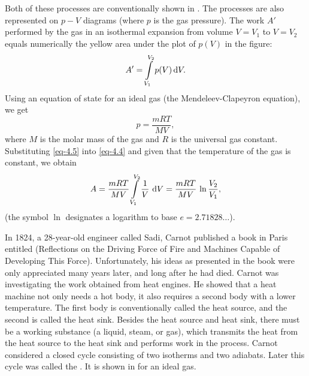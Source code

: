 Both of these processes are conventionally shown in . The processes are also represented on $p-V$ diagrams (where $p$ is the gas pressure). The work $A'$ performed by the gas in an isothermal expansion from volume $V= V_{1}$ to $V= V_{2}$ equals numerically the yellow area under the plot of $p (V)$ in the figure:
\begin{equation}%
A' = \int\displaylimits_{V_{1}}^{V_{2}} p(V) \, \dd V.
\label{eq-4.4}
\end{equation}
Using an equation of state for an ideal gas (the Mendeleev-Clapeyron equation), we get
\begin{equation}%
p= \frac{mRT}{MV},
\label{eq-4.5}
\end{equation}
where $M$ is the molar mass of the gas and $R$ is the universal gas constant. Substituting \eqref{eq-4.5} into \eqref{eq-4.4} and given that the temperature of the gas is constant, we obtain
\begin{equation}%
A = \frac{mRT}{MV} \int\displaylimits_{V_{1}}^{V_{2}} \frac{1}{V} \,\, \dd V = \frac{mRT}{MV} \, \ln \frac{V_{2}}{V_{1}},
\label{eq-4.6}
\end{equation}
(the symbol $\ln$ designates a logarithm to base $e = 2.71828 \ldots{}$). 



 In 1824, a 28-year-old engineer called Sadi, Carnot published a book in Paris entitled  (Reflections on the Driving Force of Fire and Machines Capable of Developing This Force). Unfortunately, his ideas as presented in the book were only appreciated many years later, and long after he had died. Carnot was investigating the work obtained from heat engines. He showed that a heat machine not only needs a hot body, it also requires a second body with a lower temperature. The first body is conventionally called the heat source, and the second is called the heat sink. Besides the heat source and heat sink, there must be a working substance (a liquid, steam, or gas), which transmits the heat from the heat source to the heat sink and performs work in the process. Carnot considered a closed cycle consisting of two isotherms and two adiabats. Later this cycle was called the . It is shown in  for an ideal gas. 

